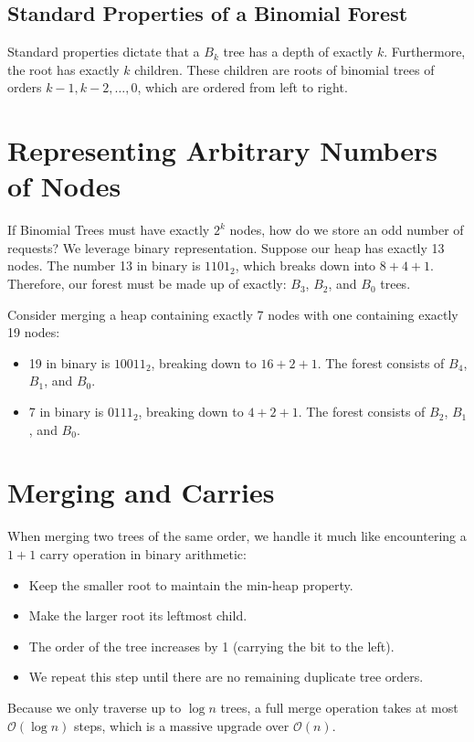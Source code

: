 \documentclass[11pt, a4paper]{report}
\begin{document}
\subsection{Standard Properties of a Binomial Forest}
Standard properties dictate that a $B_k$ tree has a depth of exactly $k$. Furthermore, the root has exactly $k$ children. These children are roots of binomial trees of orders $k-1, k-2, \dots, 0$, which are ordered from left to right.

\section{Representing Arbitrary Numbers of Nodes}
If Binomial Trees must have exactly $2^k$ nodes, how do we store an odd number of requests? We leverage binary representation. Suppose our heap has exactly 13 nodes. The number 13 in binary is $1101_2$, which breaks down into $8 + 4 + 1$. Therefore, our forest must be made up of exactly: $B_3$, $B_2$, and $B_0$ trees.

Consider merging a heap containing exactly 7 nodes with one containing exactly 19 nodes:
\begin{itemize}
    \item 19 in binary is $10011_2$, breaking down to $16 + 2 + 1$. The forest consists of $B_4$, $B_1$, and $B_0$.
    \item 7 in binary is $0111_2$, breaking down to $4 + 2 + 1$. The forest consists of $B_2$, $B_1$, and $B_0$.
\end{itemize}

\section{Merging and Carries}
When merging two trees of the same order, we handle it much like encountering a $1 + 1$ carry operation in binary arithmetic:
\begin{itemize}
    \item Keep the smaller root to maintain the min-heap property.
    \item Make the larger root its leftmost child.
    \item The order of the tree increases by 1 (carrying the bit to the left).
    \item We repeat this step until there are no remaining duplicate tree orders.
\end{itemize}
Because we only traverse up to $\log n$ trees, a full merge operation takes at most $\mathcal{O}(\log n)$ steps, which is a massive upgrade over $\mathcal{O}(n)$.
\end{document}
